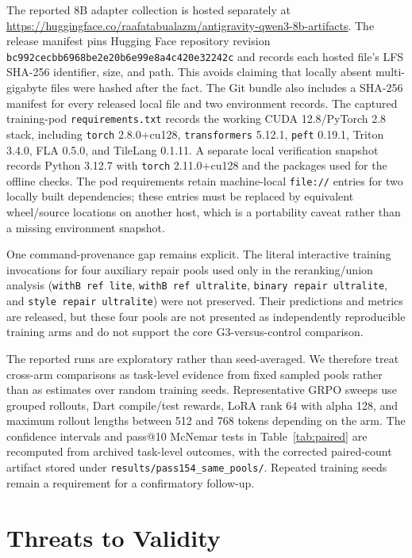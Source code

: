 \documentclass[11pt]{article}
\begin{document}
The reported 8B adapter collection is hosted separately at \url{https://huggingface.co/raafatabualazm/antigravity-qwen3-8b-artifacts}. The release manifest pins Hugging Face repository revision \texttt{bc992cecbb6968be2e20b6e99e8a4c420e32242c} and records each hosted file's LFS SHA-256 identifier, size, and path. This avoids claiming that locally absent multi-gigabyte files were hashed after the fact. The Git bundle also includes a SHA-256 manifest for every released local file and two environment records. The captured training-pod \texttt{requirements.txt} records the working CUDA 12.8/PyTorch 2.8 stack, including \texttt{torch} 2.8.0+cu128, \texttt{transformers} 5.12.1, \texttt{peft} 0.19.1, Triton 3.4.0, FLA 0.5.0, and TileLang 0.1.11. A separate local verification snapshot records Python 3.12.7 with \texttt{torch} 2.11.0+cu128 and the packages used for the offline checks. The pod requirements retain machine-local \texttt{file://} entries for two locally built dependencies; these entries must be replaced by equivalent wheel/source locations on another host, which is a portability caveat rather than a missing environment snapshot.

One command-provenance gap remains explicit. The literal interactive training invocations for four auxiliary repair pools used only in the reranking/union analysis (\texttt{withB ref lite}, \texttt{withB ref ultralite}, \texttt{binary repair ultralite}, and \texttt{style repair ultralite}) were not preserved. Their predictions and metrics are released, but these four pools are not presented as independently reproducible training arms and do not support the core G3-versus-control comparison.

The reported runs are exploratory rather than seed-averaged. We therefore treat cross-arm comparisons as task-level evidence from fixed sampled pools rather than as estimates over random training seeds. Representative GRPO sweeps use grouped rollouts, Dart compile/test rewards, LoRA rank 64 with alpha 128, and maximum rollout lengths between 512 and 768 tokens depending on the arm. The confidence intervals and pass@10 McNemar tests in Table~\ref{tab:paired} are recomputed from archived task-level outcomes, with the corrected paired-count artifact stored under \texttt{results/pass154\_same\_pools/}. Repeated training seeds remain a requirement for a confirmatory follow-up.

\section{Threats to Validity}
\end{document}
